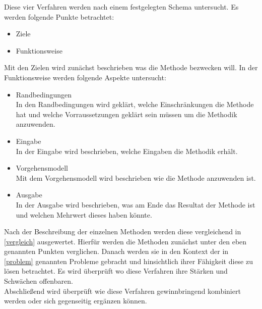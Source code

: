 Diese vier Verfahren werden nach einem festgelegten Schema untersucht. Es werden folgende Punkte betrachtet:\\

\begin{itemize}
\item Ziele
\item Funktionsweise\\
\end{itemize}

Mit den Zielen wird zunächst beschrieben was die Methode bezwecken will. In der Funktionsweise werden folgende Aspekte untersucht:\\

\begin{itemize}
\item Randbedingungen \\
In den Randbedingungen wird geklärt, welche Einschränkungen die Methode hat und welche Vorraussetzungen geklärt sein müssen um die Methodik anzuwenden.
\item Eingabe \\
In der Eingabe wird beschrieben, welche Eingaben die Methodik erhält.
\item Vorgehensmodell \\
Mit dem Vorgehensmodell wird beschrieben wie die Methode anzuwenden ist.
\item Ausgabe \\
In der Ausgabe wird beschrieben, was am Ende das Resultat der Methode ist und welchen Mehrwert dieses haben könnte.\\
\end{itemize}

Nach der Beschreibung der einzelnen Methoden werden diese vergleichend in \ref{vergleich} ausgewertet. Hierfür werden die Methoden zunächst unter den eben genannten Punkten verglichen. Danach werden sie in den Kontext der in \ref{problem} genannten Probleme gebracht und hinsichtlich ihrer Fähigkeit diese zu lösen betrachtet. Es wird überprüft wo diese Verfahren ihre Stärken und Schwächen offenbaren. \\

Abschließend wird überprüft wie diese Verfahren gewinnbringend kombiniert werden oder sich gegenseitig ergänzen können. 
